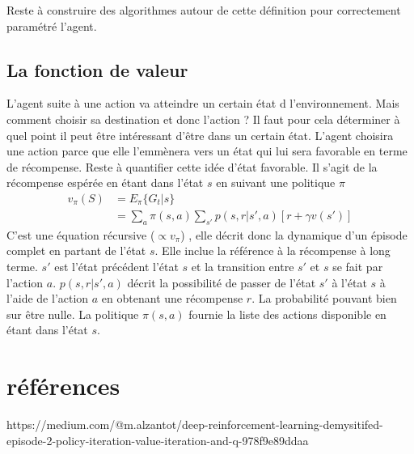 \documentclass[11pt]{article} %
\begin{document}
Reste à construire des algorithmes autour de cette définition pour correctement paramétré l'agent.

\subsection{La fonction de valeur}

L'agent suite à une action va atteindre un certain état d l'environnement. Mais comment choisir sa destination et donc l'action ? Il faut pour cela déterminer à quel point il peut être intéressant d'être dans un certain état. 
L'agent choisira une action parce que elle l'emmènera vers un état qui lui sera favorable en terme de récompense.
Reste à quantifier cette idée d'état favorable. Il s'agit de la récompense espérée en étant dans l'état $s$ en suivant une politique $\pi$
\begin{align}
v_\pi (S) &= E_\pi \{G_t |s\} \\
		&= \sum_{a} \pi(s,a) \sum_{s'}p(s,r|s',a)[r+ \gamma v(s')]
\end{align}
C'est une équation récursive ($\propto v_\pi$) , elle décrit donc la dynamique d'un épisode complet en partant de l'état $s$. Elle inclue la référence à la récompense à long terme. $s'$ est l'état précédent l'état $s$ et la transition entre $s'$ et $s$ se fait par l'action $a$.
$p(s,r|s',a)$ décrit la possibilité de passer de l'état $s'$ à l'état $s$ à l'aide de l'action $a$ en obtenant une récompense $r$. La probabilité pouvant bien sur être nulle. La politique $\pi(s,a)$ fournie la liste des actions disponible en étant dans l'état $s$.  
\section{références}
https://medium.com/@m.alzantot/deep-reinforcement-learning-demysitifed-episode-2-policy-iteration-value-iteration-and-q-978f9e89ddaa
\end{document}
